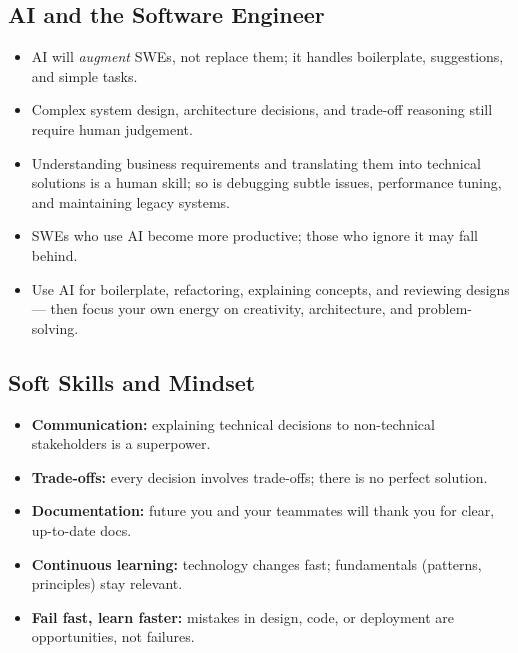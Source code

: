 \documentclass[hidelinks]{article}
\begin{document}
\subsection{AI and the Software Engineer}
\begin{itemize}
  \item AI will \emph{augment} SWEs, not replace them; it handles boilerplate, suggestions, and
        simple tasks.
  \item Complex system design, architecture decisions, and trade-off reasoning still require human
        judgement.
  \item Understanding business requirements and translating them into technical solutions is a human
        skill; so is debugging subtle issues, performance tuning, and maintaining legacy systems.
  \item SWEs who use AI become more productive; those who ignore it may fall behind.
  \item Use AI for boilerplate, refactoring, explaining concepts, and reviewing designs --- then focus
        your own energy on creativity, architecture, and problem-solving.
\end{itemize}

\subsection{Soft Skills and Mindset}
\begin{itemize}
  \item \textbf{Communication:} explaining technical decisions to non-technical stakeholders is a
        superpower.
  \item \textbf{Trade-offs:} every decision involves trade-offs; there is no perfect solution.
  \item \textbf{Documentation:} future you and your teammates will thank you for clear, up-to-date
        docs.
  \item \textbf{Continuous learning:} technology changes fast; fundamentals (patterns, principles)
        stay relevant.
  \item \textbf{Fail fast, learn faster:} mistakes in design, code, or deployment are opportunities,
        not failures.
\end{itemize}
\end{document}
